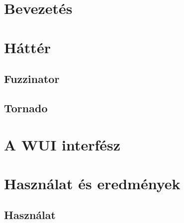 \documentclass[12pt]{report}
\theoremstyle{definition}
\begin{document}

    \chapter*{Bevezetés}
    \label{sec:Bevezetés}



    \chapter{Háttér}
    \label{sec:Hatter}


    \section{Fuzzinator}
    \label{sec:Fuzzinator}


    \section{Tornado}
    \label{sec:Tornado}



    \chapter{A WUI interfész}



    \chapter{Használat és eredmények}


    \section{Használat}
\end{document}

